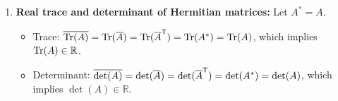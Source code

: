 \begin{exercisesolution*}
\begin{enumerate}[label=\textbf{(\alph*)}]
    \item \textbf{Real trace and determinant of Hermitian matrices:}
    Let $A^* = A$.
    \begin{itemize}
        \item Trace: $\overline{\operatorname{Tr}(A)} = \operatorname{Tr}(\overline{A}) = \operatorname{Tr}(\overline{A}^{\mathsf{T}}) = \operatorname{Tr}(A^*) = \operatorname{Tr}(A)$, which implies $\operatorname{Tr}(A) \in \mathbb{R}$.
        \item Determinant: $\overline{\det(A)} = \det(\overline{A}) = \det(\overline{A}^{\mathsf{T}}) = \det(A^*) = \det(A)$, which implies $\det(A) \in \mathbb{R}$. \qedhere
    \end{itemize}
\end{enumerate}
\end{exercisesolution*}

